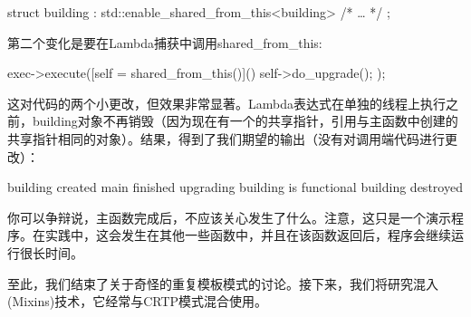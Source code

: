 \begin{cpp}
struct building : std::enable_shared_from_this<building>
{
	/* … */
};
\end{cpp}

第二个变化是要在Lambda捕获中调用shared\_from\_this:

\begin{cpp}
exec->execute([self = shared_from_this()]() {
	self->do_upgrade();
});
\end{cpp}

这对代码的两个小更改，但效果非常显著。Lambda表达式在单独的线程上执行之前，building对象不再销毁（因为现在有一个的共享指针，引用与主函数中创建的共享指针相同的对象）。结果，得到了我们期望的输出（没有对调用端代码进行更改）：

\begin{shell}
building created
main finished
upgrading
building is functional
building destroyed
\end{shell}

你可以争辩说，主函数完成后，不应该关心发生了什么。注意，这只是一个演示程序。在实践中，这会发生在其他一些函数中，并且在该函数返回后，程序会继续运行很长时间。

至此，我们结束了关于奇怪的重复模板模式的讨论。接下来，我们将研究混入(Mixins)技术，它经常与CRTP模式混合使用。





















